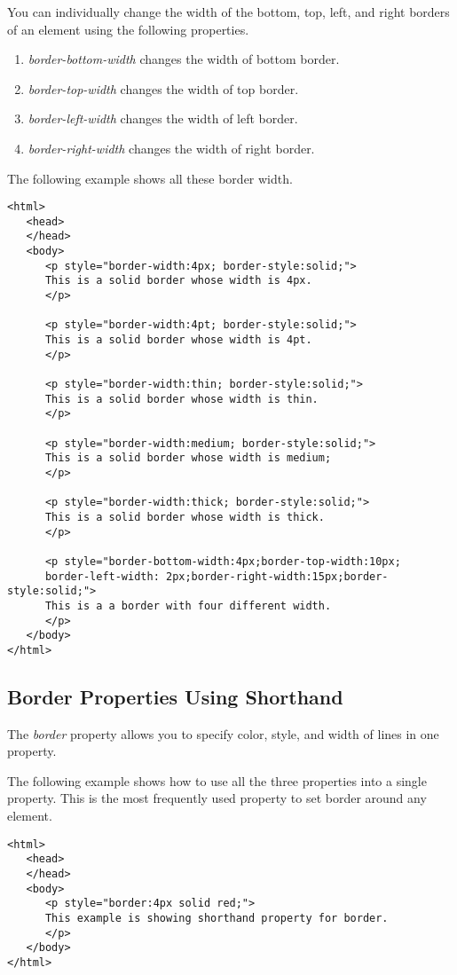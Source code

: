 \documentclass[a4paper,oneside]{book}
\numberwithin{equation}{chapter}
\begin{document}
You can individually change the width of the bottom, top, left, and right borders of an element using the following properties.
\begin{enumerate}
\item \textit{border-bottom-width} changes the width of bottom border.
\item \textit{border-top-width} changes the width of top border.
\item \textit{border-left-width} changes the width of left border.
\item \textit{border-right-width} changes the width of right border.
\end{enumerate}
The following example shows all these border width.
\begin{verbatim}
<html>
   <head>
   </head>
   <body>
      <p style="border-width:4px; border-style:solid;">
      This is a solid border whose width is 4px.
      </p>
      
      <p style="border-width:4pt; border-style:solid;">
      This is a solid border whose width is 4pt.
      </p>
      
      <p style="border-width:thin; border-style:solid;">
      This is a solid border whose width is thin.
      </p>
      
      <p style="border-width:medium; border-style:solid;">
      This is a solid border whose width is medium;
      </p>
      
      <p style="border-width:thick; border-style:solid;">
      This is a solid border whose width is thick.
      </p>
      
      <p style="border-bottom-width:4px;border-top-width:10px;
      border-left-width: 2px;border-right-width:15px;border-style:solid;">
      This is a a border with four different width.
      </p>
   </body>
</html>
\end{verbatim}
\subsection{Border Properties Using Shorthand}
The \textit{border} property allows you to specify color, style, and width of lines in one property.

The following example shows how to use all the three properties into a single property. This is the most frequently used property to set border around any element.
\begin{verbatim}
<html>
   <head>
   </head>
   <body>
      <p style="border:4px solid red;">
      This example is showing shorthand property for border.
      </p>
   </body>
</html>
\end{verbatim}
\end{document}
